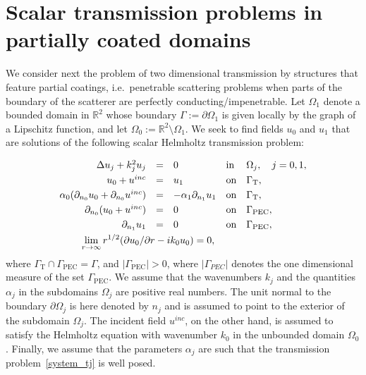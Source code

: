 \documentclass[11pt]{article}
\numberwithin{equation}{section}
\newcommand{\PEC}{\mathrm{PEC}}
\newcommand{\TR}{\mathrm{T}}
\begin{document}
 \section{Scalar transmission problems in partially coated domains\label{MS1}}



We consider next the problem of two dimensional transmission by structures that feature partial coatings, i.e.~penetrable scattering problems when parts of the boundary of the scatterer are perfectly conducting/impenetrable. Let $\Omega_1$ denote a bounded domain in $\mathbb{R}^2$ whose boundary $\Gamma:=\partial\Omega_1$ is given locally by the graph of a Lipschitz function, and let $\Omega_0:=\mathbb{R}^2\setminus\Omega_1$. We seek to find fields $u_0$ and $u_1$ that are solutions of the following scalar Helmholtz transmission problem:

\begin{equation}\label{system_tj}
\begin{array}{rclll}
 \Delta u_j +k_j^2 u_j &=&0& {\rm in}& \Omega_j,\quad j=0,1,\smallskip\\
  u_0+u^{inc}&=&u_1&{\rm on}& \Gamma_\TR,\smallskip\\
  \alpha_0(\partial_{n_0}u_0+\partial_{n_0}u^{inc})&=&-\alpha_1\partial_{n_1}u_1&{\rm on}& \Gamma_\TR,\smallskip\\
  \partial_{n_0}(u_0+u^{inc})&=&0&{\rm on}& \Gamma_{\PEC},\smallskip\\
  \partial_{n_1}u_1&=&0&{\rm on}& \Gamma_{\PEC},\smallskip\\
\multicolumn{4}{c}{\displaystyle \lim_{r\to\infty}r^{1/2}(\partial u_0/\partial r-ik_0u_0)=0,} \end{array}\end{equation}
where $\Gamma_\TR\cap \Gamma_{\PEC}=\Gamma$, and $|\Gamma_{\PEC}|>0$, where $|\Gamma_{PEC}|$ denotes the one dimensional measure of the set $\Gamma_{\PEC}$. We assume that the wavenumbers $k_j$ and the quantities $\alpha_j$ in the subdomains $\Omega_j$ are positive real numbers. The unit normal to the boundary $\partial\Omega_j$ is here denoted by $n_j$ and is assumed to point to the exterior of the subdomain $\Omega_j$. The incident field $u^{inc}$, on the other hand, is assumed to satisfy the Helmholtz equation with wavenumber $k_0$ in the unbounded domain $\Omega_0$. Finally, we assume that the parameters $\alpha_j$ are such that the transmission problem~\eqref{system_tj} is well posed.
\end{document}
